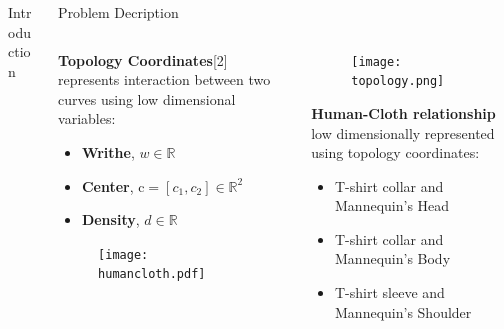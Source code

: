 \documentclass[final,hyperref={pdfpagelabels=false}]{beamer}
\begin{document}
\begin{frame}[t]
\begin{columns}[t]
\begin{column}{0.47\linewidth}
\begin{block}{Introduction}
\begin{columns}[t]
\end{columns}

\end{block}

\end{column}

\begin{column}{0.47\linewidth}

\begin{block}{Problem Decription}

\begin{columns}[t]

\begin{column}{0.5\linewidth}
\textbf{Topology Coordinates}[2] represents interaction between two curves using low dimensional variables:

\begin{itemize}
\item \textbf{Writhe}, $w \in \mathbb{R}$
\vspace{3mm}
\item \textbf{Center}, $\text{c} = [c_1,c_2] \in \mathbb{R}^2$
\vspace{3mm}
\item \textbf{Density}, $d \in \mathbb{R}$
\end{itemize}

\vspace{3mm}

\begin{figure}
\centering
\texttt{[image: humancloth.pdf]}
\end{figure}

\end{column}

\begin{column}{0.5\linewidth}

\begin{figure}
\centering
\texttt{[image: topology.png]}
\end{figure}

\vspace{3mm}

\centering \textbf{Human-Cloth relationship} low dimensionally represented using topology coordinates:

\begin{itemize}
\item T-shirt collar and Mannequin's Head
\vspace{2mm}
\item T-shirt collar and Mannequin's Body
\vspace{2mm}
\item T-shirt sleeve and Mannequin's Shoulder
\end{itemize}


\end{column}
\end{columns}
\end{block}
\end{column}
\end{columns}
\end{frame}
\end{document}
